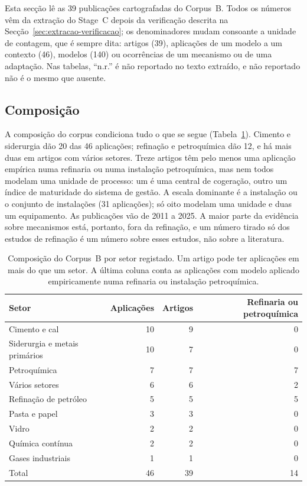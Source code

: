 Esta secção lê as 39 publicações cartografadas do Corpus~B. Todos os números
vêm da extração do Stage~C depois da verificação descrita na
Secção~\ref{sec:extracao-verificacao}; os denominadores mudam consoante a
unidade de contagem, que é sempre dita: artigos (39), aplicações de um
modelo a um contexto (46), modelos (140) ou ocorrências de um mecanismo ou de
uma adaptação. Nas tabelas, ``n.r.'' é não reportado no texto extraído, e
não reportado não é o mesmo que ausente.

\subsection{Composição}

A composição do corpus condiciona tudo o que se segue
(Tabela~\ref{tab:b-composicao}). Cimento e siderurgia dão 20 das 46
aplicações; refinação e petroquímica dão 12, e há mais duas em artigos com
vários setores. Treze artigos têm pelo menos uma aplicação empírica numa
refinaria ou numa instalação petroquímica, mas nem todos modelam uma
unidade de processo: um é uma central de cogeração, outro um índice de
maturidade do sistema de gestão. A escala dominante é a instalação ou o
conjunto de instalações (31 aplicações); só oito modelam uma unidade e
duas um equipamento. As publicações vão de 2011 a 2025. A maior parte da
evidência sobre mecanismos está, portanto, fora da refinação, e um número
tirado só dos estudos de refinação é um número sobre esses estudos, não
sobre a literatura.

\begin{table}[htbp]
  \centering
  \caption[Composição do Corpus B por setor]{Composição do Corpus~B por
  setor registado. Um artigo pode ter aplicações em mais do que um setor.
  A última coluna conta as aplicações com modelo aplicado empiricamente numa
  refinaria ou instalação petroquímica.}
  \label{tab:b-composicao}
  \begin{tabular}{lrrr}
    \toprule
    Setor & Aplicações & Artigos & Refinaria ou petroquímica \\
    \midrule
    Cimento e cal & 10 & 9 & 0 \\
    Siderurgia e metais primários & 10 & 7 & 0 \\
    Petroquímica & 7 & 7 & 7 \\
    Vários setores & 6 & 6 & 2 \\
    Refinação de petróleo & 5 & 5 & 5 \\
    Pasta e papel & 3 & 3 & 0 \\
    Vidro & 2 & 2 & 0 \\
    Química contínua & 2 & 2 & 0 \\
    Gases industriais & 1 & 1 & 0 \\
    \midrule
    Total & 46 & 39 & 14 \\
    \bottomrule
  \end{tabular}
\end{table}

